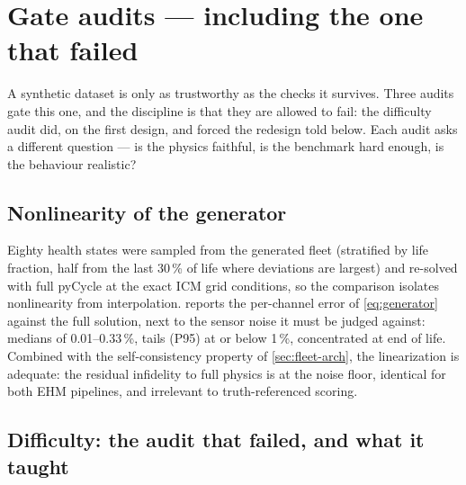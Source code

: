\begin{table}[htbp]
  \centering\small
  \caption{SynCFM56 v1.1 --- the frozen evaluation dataset --- at a glance. Auto-generated
  from the fleet artifacts.}
  \label{tab:fleet}
  
\end{table}

\section{Gate audits --- including the one that failed}
\label{sec:audits}

A synthetic dataset is only as trustworthy as the checks it survives. Three audits gate this
one, and the discipline is that they are allowed to fail: the difficulty audit did, on the
first design, and forced the redesign told below. Each audit asks a different question ---
is the physics faithful, is the benchmark hard enough, is the behaviour realistic?

\subsection{Nonlinearity of the generator}
\label{sec:audit-nonlin}

Eighty health states were sampled from the generated fleet (stratified by life fraction,
half from the last 30\,\% of life where deviations are largest) and re-solved with full
pyCycle at the exact ICM grid conditions, so the comparison isolates nonlinearity from
interpolation.  reports the per-channel error of \cref{eq:generator} against
the full solution, next to the sensor noise it must be judged against: medians of
0.01--0.33\,\%, tails (P95) at or below 1\,\%, concentrated at end of life. Combined with the
self-consistency property of \cref{sec:fleet-arch}, the linearization is adequate: the residual
infidelity to full physics is at the noise floor, identical for both EHM pipelines, and
irrelevant to truth-referenced scoring.

\begin{table}[htbp]
  \centering\small
  \caption{Nonlinearity audit: linear generator versus full pyCycle solves at fleet-sampled
  health states. Auto-generated.}
  \label{tab:nonlin}
  
\end{table}

\subsection{Difficulty: the audit that failed, and what it taught}
\label{sec:audit-difficulty}

